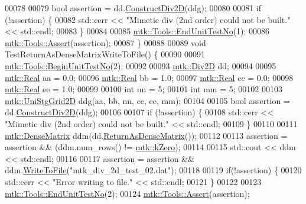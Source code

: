 \begin{DoxyCode}
00078 
00079   \textcolor{keywordtype}{bool} assertion = dd.\hyperlink{classmtk_1_1Div2D_a4214055909a6b94fcb9d657cc839055f}{ConstructDiv2D}(ddg);
00080 
00081   \textcolor{keywordflow}{if} (!assertion) \{
00082     std::cerr << \textcolor{stringliteral}{"Mimetic div (2nd order) could not be built."} << std::endl;
00083   \}
00084 
00085   \hyperlink{classmtk_1_1Tools_ad8cf0085133dd40c913fe195bc5b9694}{mtk::Tools::EndUnitTestNo}(1);
00086   \hyperlink{classmtk_1_1Tools_aa311fada9255627d06c56b1e4fedce9e}{mtk::Tools::Assert}(assertion);
00087 \}
00088 
00089 \textcolor{keywordtype}{void} TestReturnAsDenseMatrixWriteToFile() \{
00090 
00091   \hyperlink{classmtk_1_1Tools_a26ee906d28523378522a75e25c3a4e19}{mtk::Tools::BeginUnitTestNo}(2);
00092 
00093   \hyperlink{classmtk_1_1Div2D}{mtk::Div2D} dd;
00094 
00095   \hyperlink{group__c01-roots_gac080bbbf5cbb5502c9f00405f894857d}{mtk::Real} aa = 0.0;
00096   \hyperlink{group__c01-roots_gac080bbbf5cbb5502c9f00405f894857d}{mtk::Real} bb = 1.0;
00097   \hyperlink{group__c01-roots_gac080bbbf5cbb5502c9f00405f894857d}{mtk::Real} cc = 0.0;
00098   \hyperlink{group__c01-roots_gac080bbbf5cbb5502c9f00405f894857d}{mtk::Real} ee = 1.0;
00099 
00100   \textcolor{keywordtype}{int} nn = 5;
00101   \textcolor{keywordtype}{int} mm = 5;
00102 
00103   \hyperlink{classmtk_1_1UniStgGrid2D}{mtk::UniStgGrid2D} ddg(aa, bb, nn, cc, ee, mm);
00104 
00105   \textcolor{keywordtype}{bool} assertion = dd.\hyperlink{classmtk_1_1Div2D_a4214055909a6b94fcb9d657cc839055f}{ConstructDiv2D}(ddg);
00106 
00107   \textcolor{keywordflow}{if} (!assertion) \{
00108     std::cerr << \textcolor{stringliteral}{"Mimetic div (2nd order) could not be built."} << std::endl;
00109   \}
00110 
00111   \hyperlink{classmtk_1_1DenseMatrix}{mtk::DenseMatrix} ddm(dd.\hyperlink{classmtk_1_1Div2D_ae4f880fb28ad2379906e9ac0dfaa4458}{ReturnAsDenseMatrix}());
00112 
00113   assertion = assertion && (ddm.num\_rows() != \hyperlink{group__c01-roots_ga59a451a5fae30d59649bcda274fea271}{mtk::kZero});
00114 
00115   std::cout << ddm << std::endl;
00116 
00117   assertion = assertion && ddm.\hyperlink{classmtk_1_1DenseMatrix_a783d5ea89262d4e2eeb14b9c1ecd0063}{WriteToFile}(\textcolor{stringliteral}{"mtk\_div\_2d\_test\_02.dat"});
00118 
00119   \textcolor{keywordflow}{if}(!assertion) \{
00120     std::cerr << \textcolor{stringliteral}{"Error writing to file."} << std::endl;
00121   \}
00122 
00123   \hyperlink{classmtk_1_1Tools_ad8cf0085133dd40c913fe195bc5b9694}{mtk::Tools::EndUnitTestNo}(2);
00124   \hyperlink{classmtk_1_1Tools_aa311fada9255627d06c56b1e4fedce9e}{mtk::Tools::Assert}(assertion);

\end{DoxyCode}
